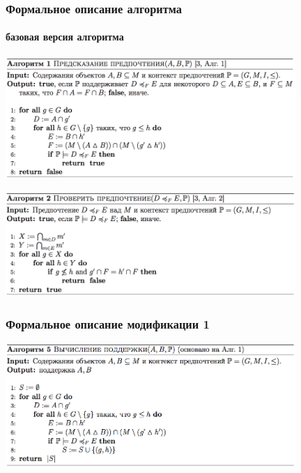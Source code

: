 \documentclass[xcolor=table,handout]{beamer}
\theoremstyle{definition}
\begin{document}
	\begin{frame}[allowframebreaks]
		\frametitle{Формальное описание алгоритма}
		\framesubtitle{базовая версия алгоритма}
		\begin{center}
			\includegraphics[width=110mm]{./images/algo1.png}
		\end{center}
		\begin{center}
			\includegraphics[width=110mm]{./images/algo2.png}
		\end{center}
	\end{frame}
	
	\begin{frame}[allowframebreaks]
		\frametitle{Формальное описание модификации 1}
		\begin{center}
			\includegraphics[width=110mm]{./images/algo5.png}
		\end{center}
	\end{frame}
	
\end{document}
